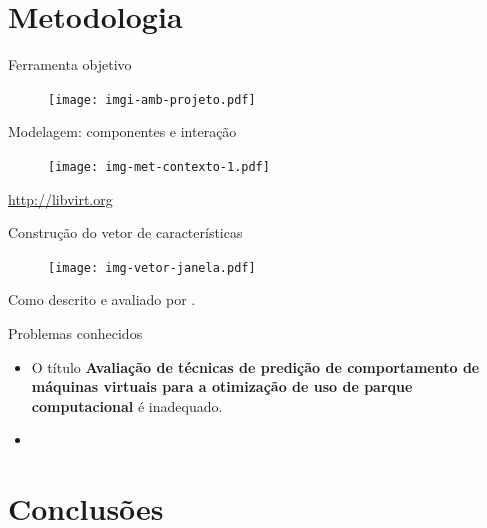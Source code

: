 \documentclass{beamer}
\begin{document}
\section{Metodologia}

\begin{frame}{Ferramenta objetivo}
\begin{figure}
\centering
\texttt{[image: imgi-amb-projeto.pdf]}
\end{figure}
\end{frame}

\begin{frame}{Modelagem: componentes e interação}
\begin{figure}
\centering
\texttt{[image: img-met-contexto-1.pdf]}
\end{figure}
\tiny{\url{http://libvirt.org}}
\end{frame}

\begin{frame}{Construção do vetor de características}
\begin{figure}
\centering
\texttt{[image: img-vetor-janela.pdf]}
\end{figure}
\tiny{Como descrito e avaliado por \cite{frank2001time}.}
\end{frame}

\begin{frame}{Problemas conhecidos}
\begin{itemize}
  \item O título \textbf{Avaliação de técnicas de predição de comportamento
        de máquinas virtuais para a otimização de uso de parque computacional} é
        inadequado.
  \item 
\end{itemize}
\end{frame}

\section{Conclusões}
\end{document}
